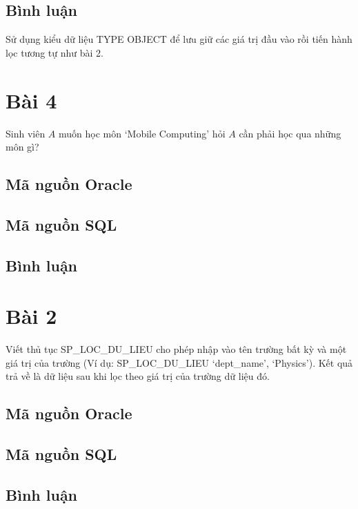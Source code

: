 \documentclass[12pt,a4paper]{report}
\begin{document}
\subsection{Bình luận}
Sử dụng kiểu dữ liệu TYPE OBJECT để lưu giữ các giá trị đầu vào rồi tiến hành lọc tương tự như bài 2.
\section{Bài 4}
\begin{boxedminipage}[t]{15.5cm}
	Sinh viên $A$ muốn học môn ‘Mobile Computing’ hỏi $A$ cần phải học qua những môn gì?	
\end{boxedminipage}

\subsection{Mã nguồn Oracle}

\subsection{Mã nguồn SQL}

\subsection{Bình luận}

\section{Bài 2}
\begin{boxedminipage}[t]{15.5cm}
	Viết thủ tục SP\_LOC\_DU\_LIEU cho phép nhập vào tên trường bất kỳ và một giá trị của trường (Ví dụ: SP\_LOC\_DU\_LIEU ‘dept\_name’, ‘Physics’). Kết quả trả về là dữ liệu sau khi lọc theo giá trị của trường dữ liệu đó. 	
\end{boxedminipage}

\subsection{Mã nguồn Oracle}

\subsection{Mã nguồn SQL}

\subsection{Bình luận}
\end{document}

